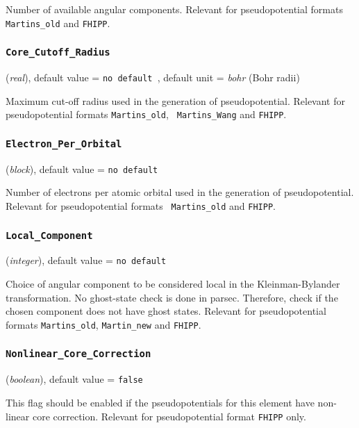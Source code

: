 \documentclass{article}
\begin{document}
Number of available angular components. Relevant for pseudopotential
formats {\tt Martins\_old} and {\tt FHIPP}.

\subsubsection{\tt Core\_Cutoff\_Radius 
\label{CoreCutoffRadius}}
({\it real}),
default value = {\tt no default },
default unit = {\it bohr} (Bohr radii)

Maximum cut-off radius used in the generation of pseudopotential.
Relevant for pseudopotential formats {\tt Martins\_old}, {\tt
  Martins\_Wang} and {\tt FHIPP}.

\subsubsection{\tt Electron\_Per\_Orbital 
\label{ElectronPerOrbital}}
({\it block}),
default value = {\tt no default }

Number of electrons per atomic orbital used in the generation of
pseudopotential. Relevant for pseudopotential formats {\tt
  Martins\_old} and {\tt FHIPP}.

\subsubsection{\tt Local\_Component 
\label{LocalComponent}}
({\it integer}),
default value = {\tt no default }

Choice of angular component to be considered local in the Kleinman-Bylander
transformation. No ghost-state check is done in parsec. Therefore, check if
the chosen component does not have ghost states. Relevant for
pseudopotential formats {\tt Martins\_old}, {\tt Martin\_new} and {\tt FHIPP}.

\subsubsection{\tt Nonlinear\_Core\_Correction 
\label{NonlinearCoreCorrection}}
({\it boolean}),
default value = {\tt false }

This flag should be enabled if the pseudopotentials for this element
have non-linear core correction. Relevant for pseudopotential format
{\tt FHIPP} only.
\end{document}
